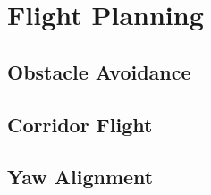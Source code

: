 \chapter{Flight Planning}

			
	\section{Obstacle Avoidance}
	
	\section{Corridor Flight}
	
	\section{Yaw Alignment}			
	
